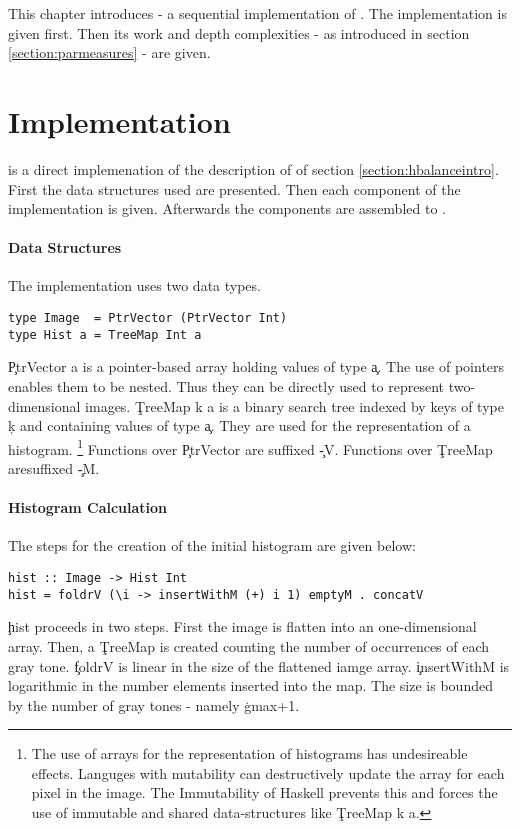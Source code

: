 

This chapter introduces \seq - a sequential implementation
of \algo. The implementation is given first. Then
its work and depth complexities - as introduced in section \ref{section:parmeasures}
- are given.


\section{Implementation}
  \seq is a direct implemenation of the description of \algo
  of section \ref{section:hbalanceintro}.
  First the data structures used are presented.
  Then each component of the implementation is given. Afterwards
  the components are assembled to \seq.
  
  \paragraph{Data Structures}
    The implementation uses two data types.
    \begin{lstlisting}
type Image  = PtrVector (PtrVector Int)
type Hist a = TreeMap Int a
    \end{lstlisting}
    \c{PtrVector a} is a pointer-based array holding values
    of type \c{a}. The use of pointers enables them to be nested.
    Thus they can be directly used to represent two-dimensional images.
    \c{TreeMap k a} is a binary search tree indexed by keys of type
    \c{k} and containing values of type \c{a}. They are
    used for the representation of a histogram.
    \footnote{The use of arrays for the representation of
    histograms has undesireable effects. Languges with
    mutability can destructively update the array
    for each pixel in the image. The Immutability
    of Haskell prevents this and forces the use of
    immutable and shared data-structures like \c{TreeMap k a}.}
    Functions over \c{PtrVector} are suffixed \c{-V}. Functions over \c{TreeMap} aresuffixed \c{-M}.
  
  \paragraph{Histogram Calculation}
    The steps for the creation of the initial histogram are given below:
    \begin{lstlisting}
hist :: Image -> Hist Int
hist = foldrV (\i -> insertWithM (+) i 1) emptyM . concatV
    \end{lstlisting}
    \c{hist} proceeds in two steps. First the image is flatten
    into an one-dimensional array. Then, a \c{TreeMap} is created
    counting the number of occurrences of each gray tone.
    \c{foldrV} is linear in the size of the flattened iamge array.
    \c{insertWithM} is logarithmic in the number elements
    inserted into the map. The size is bounded by the number of 
    gray tones - namely \c{gmax+1}.
    
